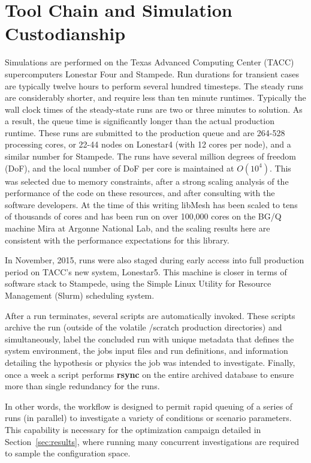 \section{Tool Chain and Simulation Custodianship}

Simulations are performed on the Texas Advanced Computing Center\cite{?}
(TACC) supercomputers Lonestar Four and Stampede. Run durations for transient
cases are typically twelve hours to perform several hundred timesteps. 
The steady runs are considerably shorter, and require less
than ten minute runtimes. Typically  the wall clock times of the
steady-state runs are two or three minutes to solution. As a result, the
queue time is significantly longer than the actual production runtime. 
These runs are submitted to the production queue and are  
264-528 processing cores, or 22-44 nodes on Lonestar4 (with 12 cores per
node), and a similar number for Stampede. The runs have
several million degrees of freedom (DoF), and the local number of DoF
per core is maintained at $O(10^4)$. This was selected due to memory
constraints, after a strong scaling analysis of the performance of the
code on these resources, and after consulting with the software developers.  
At the time of this writing libMesh has been scaled to tens of thousands of
cores and has been run on over 100,000 cores on the BG/Q machine Mira at
Argonne National Lab\cite{libmesh-scaling}, and the scaling results here
are consistent with the performance expectations for this library.

In November, 2015, runs were also staged during early access into full
production period on TACC's new system, Lonestar5. This machine is
closer in terms of software stack to Stampede, using the Simple Linux
Utility for Resource Management (Slurm)\cite{?} scheduling
system.  

After a run terminates, several scripts are automatically invoked. 
These scripts archive the run (outside of the volatile /scratch 
production directories) and simultaneously, label the concluded run with
unique metadata that defines the system environment, the jobs input
files and run definitions, and information detailing the
hypothesis or physics the job was intended to investigate. Finally, once
a week a script performs \textbf{rsync} on the entire archived database to
ensure more than single redundancy for the runs. 

In other words, the workflow is designed to permit rapid queuing of a
series of runs (in parallel) to investigate a variety of conditions or
scenario parameters. This capability is necessary for the optimization
campaign detailed in Section~\ref{sec:results}, where running many
concurrent investigations are required to sample the configuration
space.  




